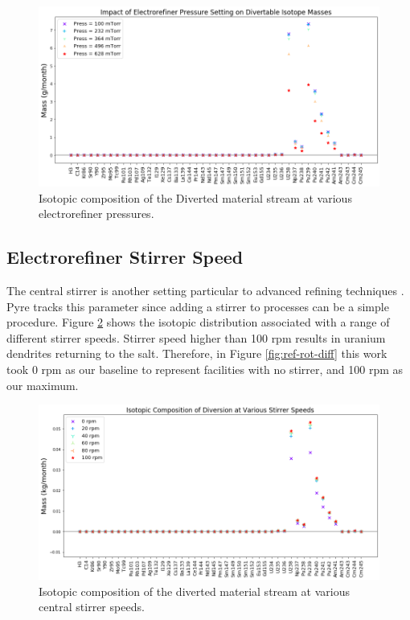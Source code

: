 \begin{figure}
	\includegraphics[width=\linewidth]{images/pressure-sa-diff}
	\caption{Isotopic composition of the Diverted material stream at various electrorefiner pressures.}
	\label{fig:ref-press-diff}
\end{figure}

\FloatBarrier

\subsection{Electrorefiner Stirrer Speed}

The central stirrer is another setting particular to advanced refining techniques \cite{lee_advanced_2008}. Pyre tracks this parameter since adding a stirrer to processes can be a simple procedure. Figure \ref{fig:ref-rot-sa} shows the isotopic distribution associated with a
range of different stirrer speeds. Stirrer speed higher than 100 rpm results in uranium dendrites returning
to the salt. Therefore, in Figure \ref{fig:ref-rot-diff} this work took 0 rpm as our baseline to represent facilities with no stirrer, and 100 rpm as our maximum. 

\begin{figure}
	\includegraphics[width=\linewidth]{images/rotation-sa-comp}
	\caption{Isotopic composition of the diverted material stream at various central stirrer speeds.}
	\label{fig:ref-rot-sa}
\end{figure}

